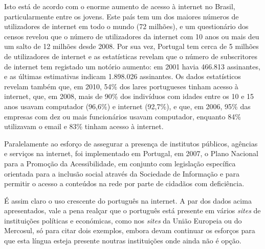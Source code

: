 \documentclass[]{../metanetpaper}
\begin{document}
\begin{multicols}{2}
Isto está de acordo com o enorme aumento de acesso à internet no Brasil, particularmente entre os jovens. Este país tem um dos maiores números de utilizadores de internet em todo o mundo (72 milhões)\cite{statop20}, e um questionário dos censos revelou que o número de utilizadores da internet com 10 anos ou mais deu um salto de 12 milhões desde 2008\cite{mybroadband}. Por sua vez, Portugal tem cerca de 5 milhões de utilizadores de internet \cite{stat4} \cite{stat15} e as estatísticas revelam que o número de subscritores de internet tem registado um notório aumento: em 2001 havia 466.813 assinantes, e as últimas estimativas indicam 1.898.026 assinantes\cite{pordata}. Os dados estatísticos revelam também que, em 2010, 54\% dos lares portugueses tinham acesso à internet, que, em 2008, mais de 90\% dos indivíduos com idades entre os 10 e 15 anos usavam computador (96,6\%) e internet (92,7\%), e que, em 2006, 95\% das empresas com dez ou mais funcionários usavam computador, enquanto 84\% utilizavam o email e 83\% tinham acesso à internet\cite{pordata}.



Paralelamente ao esforço de assegurar a presença de institutos públicos, agências e serviços na internet, foi implementado em Portugal, em 2007, o Plano Nacional para a Promoção da Acessibilidade, em conjunto com legislação específica\cite{umic} orientada para a inclusão social através da Sociedade de Informação e para permitir o acesso a conteúdos na rede por parte de cidadãos com deficiência.

É assim claro o uso crescente do português na internet. A par dos dados acima apresentados, vale a pena realçar que o português está presente em vários \textit{sites} de instituições políticas e económicas, como nos \textit{sites} da União Europeia ou do Mercosul, só para citar dois exemplos, embora devam continuar os esforços para que esta língua esteja presente noutras instituições onde ainda não é opção.

\end{multicols}

\clearpage


\end{document}

